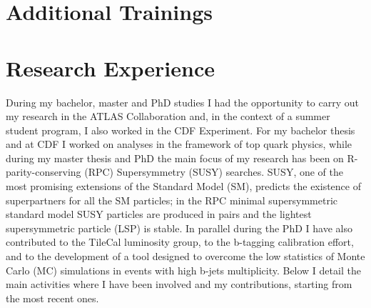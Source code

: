 \documentclass[11pt,a4paper]{moderncv}
\begin{document}
\section{Additional Trainings}

\section{Research Experience}
During my bachelor, master and PhD studies I had the opportunity to carry out my research in the ATLAS Collaboration and, in the context of a summer student program, I also worked in the CDF Experiment. 
For my bachelor thesis and at CDF I worked on analyses in the framework of top quark physics, while during my master thesis and PhD the main focus of my research has been on R-parity-conserving (RPC) Supersymmetry (SUSY) searches. SUSY, one of the most promising extensions of the Standard Model (SM), predicts the existence of superpartners for all the SM particles; in the RPC minimal supersymmetric standard model SUSY particles are produced in pairs and the lightest supersymmetric particle (LSP) is stable. In parallel during the PhD I have also contributed to the TileCal luminosity group, to the b-tagging calibration effort, and to the development of a tool designed to overcome the low statistics of Monte Carlo (MC) simulations in events with high b-jets multiplicity. Below I detail the main activities where I have been involved and my contributions, starting from the most recent ones.
\end{document}
